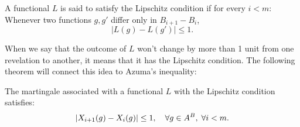 \begin{definition}
    A functional $L$ is said to satisfy the Lipschitz condition if for every $i < m$: Whenever two functions $g, g'$ differ only in $B_{i+1}- B_i$,
    \[ |L(g) - L(g')| \leq 1. \] 
\end{definition}

When we say that the outcome of $L$ won't change by more than 1 unit from one revelation to another, it means that it has the Lipschitz condition. The following theorem will connect this idea to Azuma's inequality:

\begin{theorem}\label{lipschitz-condition}
    The martingale associated with a functional $L$ with the Lipschitz condition satisfies:
    \[ |X_{i+1}(g)- X_i(g)| \leq 1,\hspace*{1em} \forall g\in A^B,\; \forall i < m. \] 
\end{theorem}

